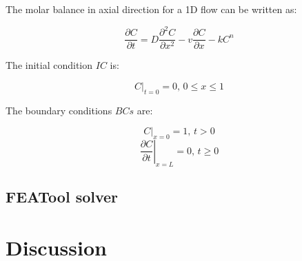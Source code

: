 \documentclass{article}
\begin{document}
The molar balance in axial direction for a 1D flow can be written as:

$$ \frac{\partial C}{\partial t} = D \frac{\partial^2 C}{\partial x^2} - v \frac{\partial C}{\partial x} - k C^n $$

The initial condition $IC$ is:

$$ \left. C \right|_{t = 0} = 0 \textrm{, } 0 \leq x \leq 1 $$

The boundary conditions $BCs$ are:

$$ \left. C \right|_{x = 0} = 1 \textrm{, } t > 0 $$
$$ \left. \frac{\partial C}{\partial t} \right|_{x = L} = 0 \textrm{, } t \geq 0 $$

\subsection{FEATool solver}

\section{Discussion}

\printbibliography[title={References}]
\end{document}
